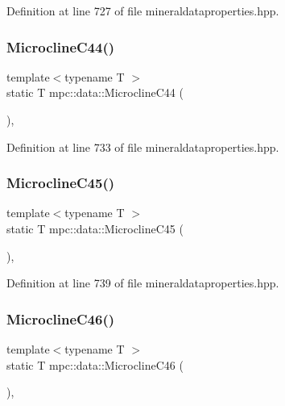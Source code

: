 Definition at line 727 of file mineraldataproperties.\+hpp.

\mbox{\label{namespacempc_1_1data_aed65d64fa6ca08a20c0dfe518f5f3a9e}} 
\subsubsection{\texorpdfstring{Microcline\+C44()}{MicroclineC44()}}
{\footnotesize\ttfamily template$<$typename T $>$ \\
static T mpc\+::data\+::\+Microcline\+C44 (\begin{DoxyParamCaption}{ }\end{DoxyParamCaption})\hspace{0.3cm}{\ttfamily [inline]}, {\ttfamily [static]}}



Definition at line 733 of file mineraldataproperties.\+hpp.

\mbox{\label{namespacempc_1_1data_aaac15ae6bad382ff8c341ef2614ccad8}} 
\subsubsection{\texorpdfstring{Microcline\+C45()}{MicroclineC45()}}
{\footnotesize\ttfamily template$<$typename T $>$ \\
static T mpc\+::data\+::\+Microcline\+C45 (\begin{DoxyParamCaption}{ }\end{DoxyParamCaption})\hspace{0.3cm}{\ttfamily [inline]}, {\ttfamily [static]}}



Definition at line 739 of file mineraldataproperties.\+hpp.

\mbox{\label{namespacempc_1_1data_aa40450fc10137e223516e404d83deabe}} 
\subsubsection{\texorpdfstring{Microcline\+C46()}{MicroclineC46()}}
{\footnotesize\ttfamily template$<$typename T $>$ \\
static T mpc\+::data\+::\+Microcline\+C46 (\begin{DoxyParamCaption}{ }\end{DoxyParamCaption})\hspace{0.3cm}{\ttfamily [inline]}, {\ttfamily [static]}}



